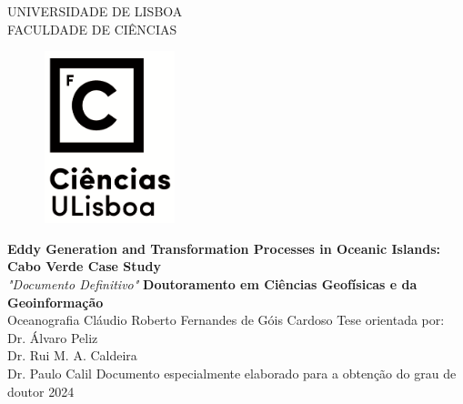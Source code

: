 \begin{titlepage}
	\centering
	UNIVERSIDADE DE LISBOA\\
	FACULDADE DE CIÊNCIAS\\
	\vfill
	\begin{figure}[h]
		\centering
		\includegraphics[width = 3.84cm,height = 5.00cm]{images/logo_vertical.png}
	\end{figure}
	
	\vfill
	\fontsize{12.2}{14.4}\selectfont \textbf{Eddy Generation and Transformation Processes in Oceanic Islands: Cabo Verde Case Study}\\
	\vfill
	\textit{"Documento Definitivo"}
	\vfill
	\textbf{Doutoramento em Ciências Geofísicas e da Geoinformação}\\
	Oceanografia
	\vfill
	Cláudio Roberto Fernandes de Góis Cardoso
	\vfill
	\fontsize{12}{14.4}\selectfont Tese orientada por:\\
	Dr. Álvaro Peliz\\
	Dr. Rui M. A. Caldeira \\
	Dr. Paulo Calil
	\vfill
	Documento especialmente elaborado para a obtenção do grau de doutor
	\vfill
	\fontsize{14}{12}2024\\
\end{titlepage}

